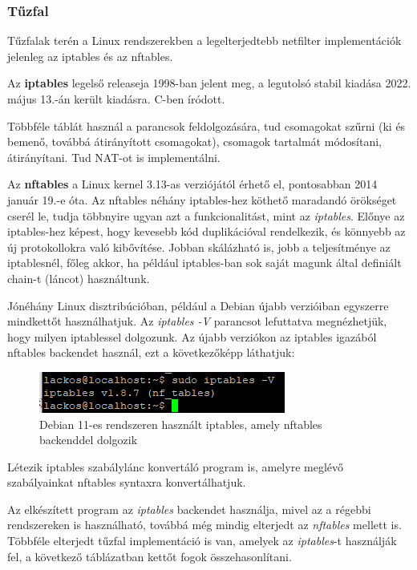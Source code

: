 \subsubsection{Tűzfal}
Tűzfalak terén a Linux rendszerekben a legelterjedtebb netfilter implementációk jelenleg az iptables és az nftables. 

Az \textbf{iptables} legelső releaseja 1998-ban jelent meg, a legutolsó stabil kiadása 2022. május 13.-án került kiadásra. C-ben íródott. \cite{iptables}

\pagebreak

Többféle táblát használ a parancsok feldolgozására, tud csomagokat szűrni (ki és bemenő, továbbá átirányított csomagokat), csomagok tartalmát módosítani, átirányítani. Tud NAT-ot is implementálni. \cite{iptables_man}

Az \textbf{nftables} a Linux kernel 3.13-as verziójától érhető el, pontosabban 2014 január 19.-e óta. Az nftables néhány iptables-hez köthető maradandó örökséget cserél le, tudja többnyire ugyan azt a funkcionalitást, mint az \textit{iptables}. Előnye az iptables-hez képest, hogy kevesebb kód duplikációval rendelkezik, és könnyebb az új protokollokra való kibővítése. \cite{nftables}
Jobban skálázható is, jobb a teljesítménye az iptablesnél, főleg akkor, ha például iptables-ban sok saját magunk által definiált chain-t (láncot) használtunk.

Jónéhány Linux disztribúcióban, például a Debian újabb verzióiban egyszerre mindkettőt használhatjuk. Az \textit{iptables -V} parancsot lefuttatva megnézhetjük, hogy milyen iptablessel dolgozunk. Az újabb verziókon az iptables igazából nftables backendet használ, ezt a következőképp láthatjuk:
\begin{figure}[h]
\centering
\includegraphics[scale=1.0]{images/iptables_nftables.png}
\caption{Debian 11-es rendszeren használt iptables, amely nftables backenddel dolgozik}
\end{figure}

Létezik iptables szabálylánc konvertáló program is, amelyre meglévő szabályainkat nftables syntaxra konvertálhatjuk. 

Az elkészített program az \textit{iptables} backendet használja, mivel az a régebbi rendszereken is használható, továbbá még mindig elterjedt az \textit{nftables} mellett is. Többféle elterjedt tűzfal implementáció is van, amelyek az \textit{iptables}-t használják fel, a következő táblázatban kettőt fogok összehasonlítani.

